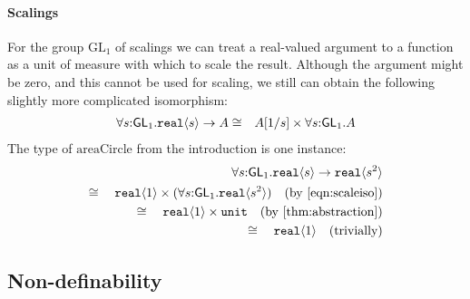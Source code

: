 \documentclass{sigplanconf}
\newcommand{\GL}[1]{\mathrm{GL}_#1}
\newcommand{\SynGL}[1]{\mathsf{GL}_#1}
\newcommand{\tyUnit}{\texttt{unit}}
\newcommand{\tyPrim}[2]{\textup{\texttt{#1}}\langle #2 \rangle}
\theoremstyle{examplestyle}
\theoremstyle{restatementstyle}
\begin{document}
\paragraph{Scalings}
For the group $\GL{1}$ of scalings we can treat
a real-valued argument to a function as a unit of measure with
which to scale the result. 
Although the argument might be zero, and this cannot be used for scaling,
we still can obtain the following slightly more complicated
isomorphism:
\begin{eqnarray}
\forall s\mathord:\SynGL{1}.\tyPrim{real}{s}\to A &
\cong & A[1/s]\times \forall s\mathord:\SynGL{1}.A\label{eqn:scaleiso}
\end{eqnarray}
The type of $\mathrm{areaCircle}$ from the introduction is one instance:
\begin{align*}
\forall s\mathord:\SynGL{1}.\tyPrim{real}{s}\to\tyPrim{real}{s^2}\\ 
\cong\quad\tyPrim{real}{1}\times(\forall
s\mathord:\SynGL{1}.\tyPrim{real}{s^2}) \quad(\text{by \autoref{eqn:scaleiso}})\\ 
\cong\quad\tyPrim{real}{1}\times \tyUnit \quad (\text{by \autoref{thm:abstraction}})\\
\cong\quad\tyPrim{real}{1}\quad (\text{trivially})
\end{align*}

\subsection{Non-definability}
\label{sec:types-indexed-abelian-groups-indef}
\end{document}

